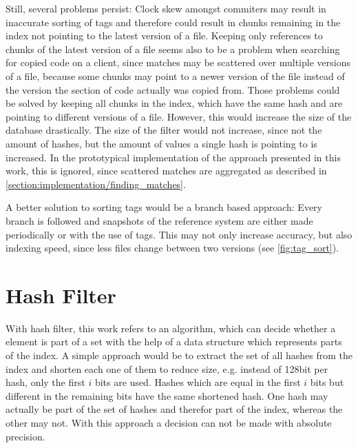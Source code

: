 Still, several problems persist: 
Clock skew amongst commiters may result in inaccurate sorting of tags and therefore could result in chunks remaining in the index not pointing to the latest version of a file.
Keeping only references to chunks of the latest version of a file seems also to be a problem when searching for copied code on a client, since matches may be scattered over multiple versions of a file, because some chunks may point to a newer version of the file instead of the version the section of code actually was copied from.
Those problems could be solved by keeping all chunks in the index, which have the same hash and are pointing to different versions of a file.
However, this would increase the size of the database drastically.
The size of the filter would not increase, since not the amount of hashes, but the amount of values a single hash is pointing to is increased.
In the prototypical implementation of the approach presented in this work, this is ignored, since scattered matches are aggregated as described in \ref{section:implementation/finding_matches}.

A better solution to sorting tags would be a branch based approach:
Every branch is followed and snapshots of the reference system are either made periodically or with the use of tags.
This may not only increase accuracy, but also indexing speed, since less files change between two versions (see \autoref{fig:tag_sort}).

\section{Hash Filter}\label{section:implementation/hash_filter}
With hash filter, this work refers to an algorithm, which can decide whether a element is part of a set with the help of a data structure which represents parts of the index.
A simple approach would be to extract the set of all hashes from the index and shorten each one of them to reduce size, e.g. instead of 128bit per hash, only the first $i$ bits are used.
Hashes which are equal in the first $i$ bits but different in the remaining bits have the same shortened hash.
One hash may actually be part of the set of hashes and therefor part of the index, whereas the other may not.
With this approach a decision can not be made with absolute precision.

